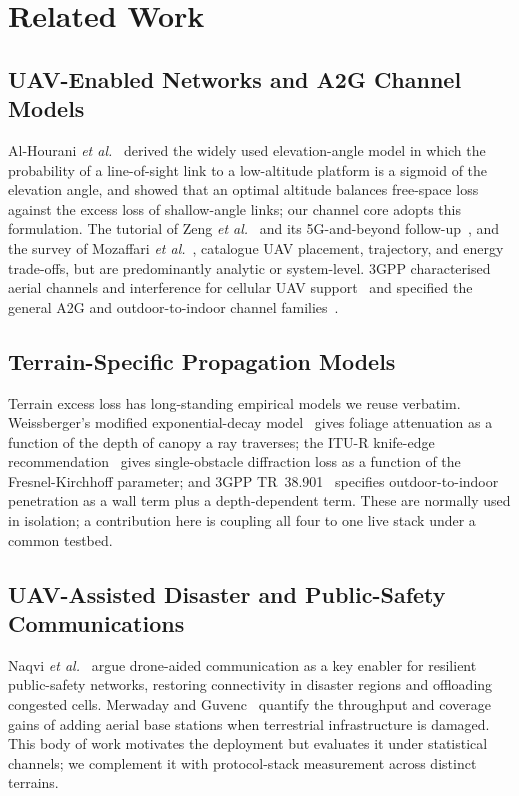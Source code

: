 \documentclass[conference]{IEEEtran}
\begin{document}
\section{Related Work}
\label{sec:related}

\subsection{UAV-Enabled Networks and A2G Channel Models}
Al-Hourani \emph{et al.}~\cite{alhourani2014optimal} derived the widely used
elevation-angle model in which the probability of a line-of-sight link to a
low-altitude platform is a sigmoid of the elevation angle, and showed that an optimal
altitude balances free-space loss against the excess loss of shallow-angle links; our
channel core adopts this formulation. The tutorial of Zeng
\emph{et al.}~\cite{zeng2016wireless} and its 5G-and-beyond
follow-up~\cite{zeng2019accessing}, and the survey of Mozaffari
\emph{et al.}~\cite{mozaffari2019tutorial}, catalogue UAV placement, trajectory, and
energy trade-offs, but are predominantly analytic or system-level. 3GPP characterised
aerial channels and interference for cellular UAV support~\cite{3gpp36777} and
specified the general A2G and outdoor-to-indoor channel families~\cite{3gpp38901}.

\subsection{Terrain-Specific Propagation Models}
Terrain excess loss has long-standing empirical models we reuse verbatim. Weissberger's
modified exponential-decay model~\cite{weissberger1982} gives foliage attenuation as a
function of the depth of canopy a ray traverses; the ITU-R knife-edge
recommendation~\cite{ituP526} gives single-obstacle diffraction loss as a function of
the Fresnel-Kirchhoff parameter; and 3GPP TR~38.901~\cite{3gpp38901} specifies
outdoor-to-indoor penetration as a wall term plus a depth-dependent term. These are
normally used in isolation; a contribution here is coupling all four to one live stack
under a common testbed.

\subsection{UAV-Assisted Disaster and Public-Safety Communications}
Naqvi \emph{et al.}~\cite{naqvi2018drone} argue drone-aided communication as a key
enabler for resilient public-safety networks, restoring connectivity in disaster
regions and offloading congested cells. Merwaday and Guvenc~\cite{merwaday2016improved}
quantify the throughput and coverage gains of adding aerial base stations when
terrestrial infrastructure is damaged. This body of work motivates the deployment but
evaluates it under statistical channels; we complement it with protocol-stack
measurement across distinct terrains.
\end{document}
